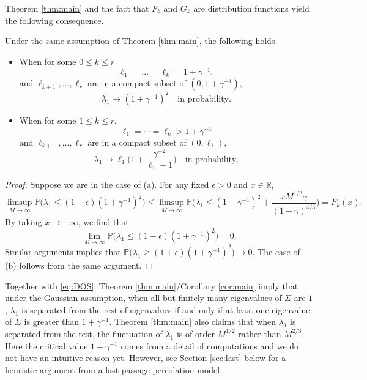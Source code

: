 \documentclass[11pt]{article}
\begin{document}
Theorem \ref{thm:main} and the fact that $F_k$ and $G_k$ are
distribution functions yield the following consequence.

\begin{cor}\label{cor:main}
Under the same assumption of Theorem \ref{thm:main}, the following
holds.
\begin{itemize}
\item[(a)] When for some $0\le k\le r$
\begin{equation}
  \ell_1=\dots= \ell_k=1+\gamma^{-1},
\end{equation}
and $\ell_{k+1}, \dots, \ell_{r}$ are in a compact subset
of $(0, 1+\gamma^{-1})$,
\begin{equation}
  \lambda_1 \to (1+\gamma^{-1})^2 \quad \text{in probability.}
\end{equation}
\item[(b)] When for some $1\le k\le r$,
\begin{equation}
  \ell_1=\cdots=\ell_k > 1+\gamma^{-1}
\end{equation}
and $\ell_{k+1}, \dots, \ell_r$ are in a compact subset of
$(0, \ell_1)$,
\begin{equation}
  \lambda_1 \to
  \ell_1 \biggl(1+\frac{\gamma^{-2}}{\ell_1-1} \biggr)
\quad \text{in probability.}
\end{equation}
\end{itemize}
\end{cor}

\begin{proof}
Suppose we are in the case of (a). For any fixed $\epsilon>0$ and
$x\in\mathbb{R}$,
\begin{equation}
  \limsup_{M\to\infty} \mathbb{P}\bigl( \lambda_1 \le (1-\epsilon) (1+\gamma^{-1})^2 \bigr)
  \le \limsup_{M\to\infty} \mathbb{P}\biggl( \lambda_1\le (1+\gamma^{-1})^2+
  \frac{xM^{1/3}\gamma}{(1+\gamma)^{4/3}} \biggr) =F_k(x).
\end{equation}
By taking $x\to-\infty$, we find that
\begin{equation}
  \lim_{M\to\infty} \mathbb{P}\bigl( \lambda_1 \le (1-\epsilon) (1+\gamma^{-1})^2
  \bigr) =0.
\end{equation}
Similar arguments implies that $\mathbb{P}\bigl( \lambda_1 \ge
(1+\epsilon) (1+\gamma^{-1})^2  \bigr) \to 0.$ The case of (b)
follows from the same argument.
\end{proof}

Together with \eqref{eq:DOS}, Theorem \ref{thm:main}/Corollary
\ref{cor:main} imply that under the Gaussian assumption, when all
but finitely many eigenvalues of $\Sigma$ are $1$, $\lambda_1$ is
separated from the rest of eigenvalues if and only if at least one
eigenvalue of $\Sigma$ is greater than $1+\gamma^{-1}$. Theorem
\ref{thm:main} also claims that when $\lambda_1$ is separated from
the rest, the fluctuation of $\lambda_1$ is of order $M^{1/2}$
rather than $M^{2/3}$. Here the critical value $1+\gamma^{-1}$
comes from a detail of computations and we do not have an
intuitive reason yet. However, see Section \ref{sec:last} below
for a heuristic argument from a last passage percolation model.
\end{document}

